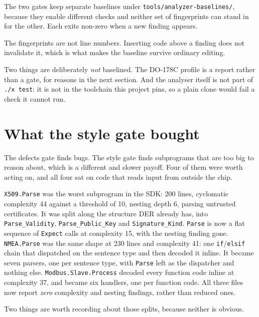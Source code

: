 The two gates keep separate baselines under \texttt{tools/analyzer-baselines/},
because they enable different checks and neither set of fingerprints can stand in for
the other. Each exits non-zero when a new finding appears.

The fingerprints are not line numbers. Inserting code above a finding does not
invalidate it, which is what makes the baseline survive ordinary editing.

Two things are deliberately \emph{not} baselined. The DO-178C profile is a report
rather than a gate, for reasons in the next section. And the analyser itself is not
part of \texttt{./x test}: it is not in the toolchain this project pins, so a plain
clone would fail a check it cannot run.

\section{What the style gate bought}

The defects gate finds bugs. The style gate finds subprograms that are too big to
reason about, which is a different and slower payoff. Four of them were worth
acting on, and all four sat on code that reads input from outside the chip.

\lstinline{X509.Parse} was the worst subprogram in the SDK: 200 lines, cyclomatic
complexity 44 against a threshold of 10, nesting depth 6, parsing untrusted
certificates. It was split along the structure DER already has, into
\lstinline{Parse_Validity}, \lstinline{Parse_Public_Key} and
\lstinline{Signature_Kind}. \lstinline{Parse} is now a flat sequence of
\lstinline{Expect} calls at complexity 15, with the nesting finding gone.
\lstinline{NMEA.Parse} was the same shape at 230 lines and complexity 41: one
\lstinline{if}/\lstinline{elsif} chain that dispatched on the sentence type and
then decoded it inline. It became seven parsers, one per sentence type, with
\lstinline{Parse} left as the dispatcher and nothing else. \lstinline{Modbus.Slave.Process}
decoded every function code inline at complexity 37, and became six handlers, one
per function code. All three files now report \emph{zero} complexity and nesting
findings, rather than reduced ones.

Two things are worth recording about those splits, because neither is obvious.

